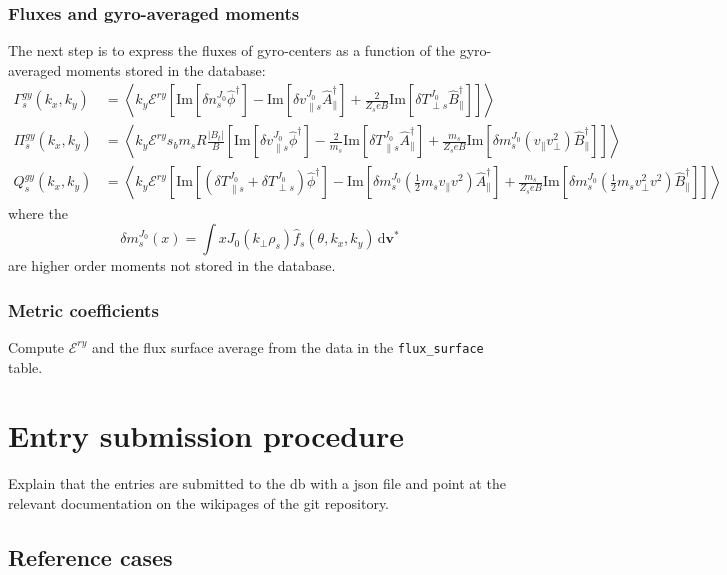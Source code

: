 \documentclass[a4paper]{report}
\begin{document}
 
\subsection{Fluxes and gyro-averaged moments}
The next step is to express the fluxes of gyro-centers as a function of the gyro-averaged moments stored in the database:
\begin{align*}
\Gamma_s^{gy}(k_x,k_y) &= \left<k_y\mathcal{E}^{ry} \left[ \textrm{Im}\left[ \delta n_s^{J_0} \hat{\phi}^\dagger \right] - \textrm{Im}\left[ \delta v_{\parallel s}^{J_0} \hat{A}_\parallel^\dagger \right] + \frac{2}{Z_s e B} \textrm{Im}\left[ \delta T_{\perp s}^{J_0} \hat{B}_\parallel^\dagger \right] \right]\right> \\ 
\Pi_s^{gy}(k_x,k_y) &= \left<k_y\mathcal{E}^{ry} s_bm_sR\frac{|B_t|}{B}\left[ \textrm{Im}\left[ \delta v_{\parallel s}^{J_0} \hat{\phi}^\dagger \right] - \frac{2}{m_s}\textrm{Im}\left[ \delta T_{\parallel s}^{J_0} \hat{A}_\parallel^\dagger \right] + \frac{m_s}{Z_s e B} \textrm{Im}\left[ \delta m_s^{J_0}(v_\parallel v_\perp^2) \hat{B}_\parallel^\dagger \right] \right]\right> \\
Q_s^{gy}(k_x,k_y) &= \left<k_y\mathcal{E}^{ry} \left[ \textrm{Im}\left[ (\delta T_{\parallel s}^{J_0}+ \delta T_{\perp s}^{J_0} )  \hat{\phi}^\dagger \right] - \textrm{Im}\left[ \delta m_s^{J_0}(\frac{1}{2}m_sv_\parallel v^2) \hat{A}_\parallel^\dagger \right] + \frac{m_s}{Z_s e B} \textrm{Im}\left[ \delta m_s^{J_0}(\frac{1}{2}m_sv_\perp^2 v^2) \hat{B}_\parallel^\dagger \right] \right]\right> \end{align*}
where the
$$\delta m_s^{J_0}(x) = \int x J_0(k_\perp \rho_s)\hat{f}_s(\theta,k_x,k_y) \,\textrm{d}\mathbf{v^*}$$
are higher order moments not stored in the database. 


\subsection{Metric coefficients}
Compute $\mathcal{E}^{ry}$ and the flux surface average from the data in the \texttt{flux\_surface} table.


\chapter{Entry submission procedure}

Explain that the entries are submitted to the db with a json file and point at the relevant documentation on the wikipages of the git repository.
\section{Reference cases}
\end{document}
